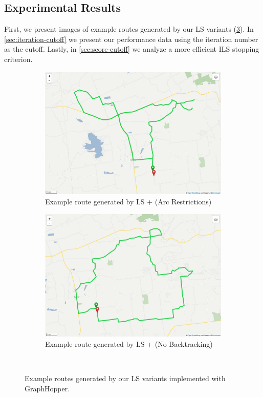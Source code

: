 \documentclass[honors]{union-cs-thesis}
\begin{document}
\subsection{Experimental Results}
First, we present images of example routes generated by our LS variants (\cref{fig:ls-route-variants}). In \cref{sec:iteration-cutoff} we present our performance data using the iteration number as the cutoff. Lastly, in \cref{sec:score-cutoff} we analyze a more efficient ILS stopping criterion.  

\begin{figure}
\begin{subfigure}{.48\linewidth}
\centering
\includegraphics[width=\textwidth]{figs/ls-route-mins}
\caption{Example route generated by LS + (Arc Restrictions)}
\label{fig:ls-arc-restrictions}
\end{subfigure}%
\hfill
\begin{subfigure}{.48\linewidth}
\centering
\includegraphics[width=\textwidth]{figs/ls-route-no-backtracking}
\caption{Example route generated by LS + (No Backtracking)}
\label{fig:ls-no-backtracking}
\end{subfigure}\\[1ex]
\caption{Example routes generated by our LS variants implemented with GraphHopper.}
\label{fig:ls-route-variants}
\end{figure}
\end{document}
